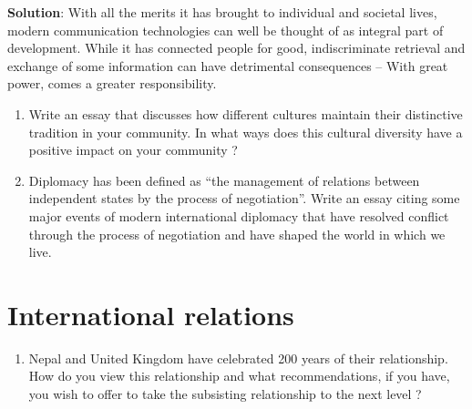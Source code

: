 \documentclass[
  openany]{book}
\providecommand{\tightlist}{%
  \setlength{\itemsep}{0pt}\setlength{\parskip}{0pt}}
\newenvironment{solution}{ {\bfseries Solution}:}{}
\begin{document}
\begin{solution}
With all the merits it has brought to individual and societal lives, modern communication technologies can well be thought of as integral part of development. While it has connected people for good, indiscriminate retrieval and exchange of some information can have detrimental consequences -- With great power, comes a greater responsibility.

\end{solution}

\begin{enumerate}
\def\labelenumi{\arabic{enumi}.}
\setcounter{enumi}{1}
\item
  Write an essay that discusses how different cultures maintain their distinctive tradition in your community. In what ways does this cultural diversity have a positive impact on your community ?
\item
  Diplomacy has been defined as ``the management of relations between independent states by the process of negotiation''. Write an essay citing some major events of modern international diplomacy that have resolved conflict through the process of negotiation and have shaped the world in which we live.
\end{enumerate}

\hypertarget{international-relations}{%
\section{International relations}\label{international-relations}}

\begin{enumerate}
\def\labelenumi{\arabic{enumi}.}
\tightlist
\item
  Nepal and United Kingdom have celebrated 200 years of their relationship. How do you view this relationship and what recommendations, if you have, you wish to offer to take the subsisting relationship to the next level ?
\end{enumerate}
\end{document}
